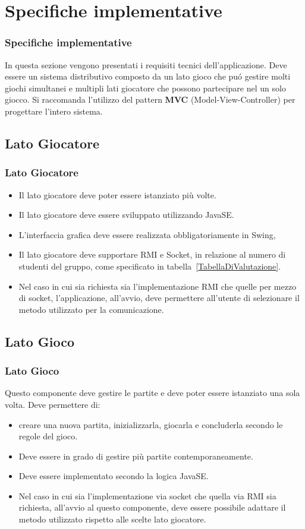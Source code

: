 \documentclass{beamer}
\begin{document}
\section{Specifiche implementative}
\begin{frame}
\frametitle{Specifiche implementative}
In questa sezione vengono presentati i requisiti tecnici
dell'applicazione.  Deve essere un sistema distributivo composto da
un lato gioco che pu\'o gestire molti giochi simultanei e multipli
lati giocatore che possono partecipare nel un solo giocco. Si raccomanda
l'utilizzo del pattern \textbf{MVC} (Model-View-Controller) per
progettare l'intero sistema.
\end{frame}

\subsection{Lato Giocatore}
\begin{frame}
\frametitle{Lato Giocatore}
\begin{itemize}
\item Il lato giocatore deve poter essere istanziato pi\`u volte. 
\item Il lato giocatore deve essere sviluppato utilizzando JavaSE. 
\item L'interfaccia grafica deve essere realizzata obbligatoriamente in Swing, 
\item Il lato giocatore deve supportare RMI e Socket, in relazione al numero di studenti del gruppo, come specificato in tabella~\ref{TabellaDiValutazione}. 
\item Nel caso in cui sia richiesta sia l'implementazione RMI che
  quelle per mezzo di socket, l'applicazione, all'avvio, deve permettere
  all'utente di selezionare il metodo utilizzato per la
  comunicazione.
\end{itemize}
\end{frame}

\subsection{Lato Gioco}
\begin{frame}
\frametitle{Lato Gioco}
Questo componente deve gestire le partite e deve poter essere
istanziato una sola volta. Deve permettere di:
\begin{itemize}
\item creare una nuova partita, inizializzarla, giocarla e concluderla secondo le regole del gioco.
\item Deve essere in grado di gestire pi\`u partite
  contemporaneamente.
\item Deve essere implementato secondo la logica JavaSE.
\item Nel caso in cui sia l'implementazione via socket che quella via
  RMI sia richiesta, all'avvio al questo componente, deve essere
  possibile adattare il metodo utilizzato rispetto alle scelte lato
  giocatore.
\end{itemize}
\end{frame}
\end{document}

